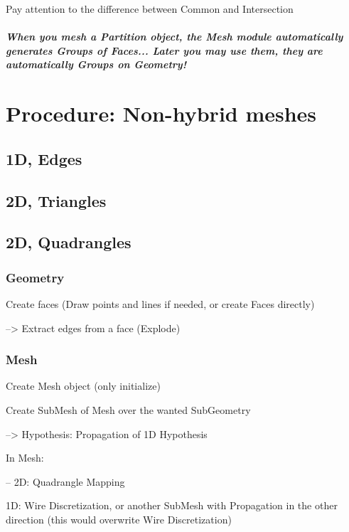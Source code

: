 \documentclass[10pt]{book}
\begin{document}
Pay attention to the difference between Common and Intersection


\paragraph{When you mesh a Partition object, the Mesh module automatically generates Groups of Faces... Later you may use them, they are automatically Groups on Geometry!}


 \chapter{Procedure: Non-hybrid meshes}


 \section{1D, Edges}

 \section{2D, Triangles}
 
  
 
 \section{2D, Quadrangles}


\subsection{Geometry}


Create faces (Draw points and lines if needed, or create Faces directly)

   --> Extract edges from a face (Explode)
   
\subsection{Mesh}
 
Create Mesh object (only initialize)

Create SubMesh of Mesh over the wanted SubGeometry

   --> Hypothesis: Propagation of 1D Hypothesis

In Mesh:

--   2D: Quadrangle Mapping

   1D: Wire Discretization, or another SubMesh with Propagation in the other direction (this would overwrite Wire Discretization)
\end{document}
